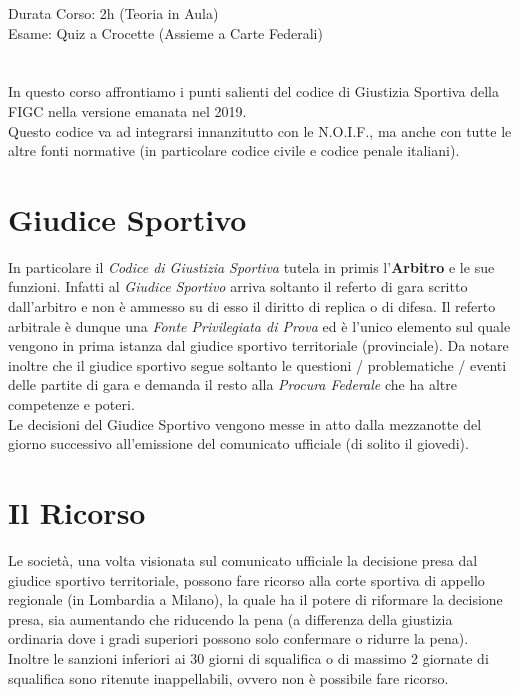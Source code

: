 \documentclass[../uefaC.tex]{subfiles}
\begin{document}

Durata Corso: 2h (Teoria in Aula) \hfill \\
Esame: Quiz a Crocette (Assieme a Carte Federali)
\hfill \\
\hfill \\
\hfill \\
In questo corso affrontiamo i punti salienti del codice di Giustizia Sportiva della FIGC nella versione emanata nel 2019. \hfill \\
Questo codice va ad integrarsi innanzitutto con le N.O.I.F., ma anche con tutte le altre fonti normative (in particolare codice civile e codice penale italiani).
\hfill \\

\section{Giudice Sportivo}
In particolare il \emph{Codice di Giustizia Sportiva} tutela in primis l'\textbf{Arbitro} e le sue funzioni. Infatti al \emph{Giudice Sportivo} arriva soltanto il referto di gara scritto dall'arbitro e non è ammesso su di esso il diritto di replica o di difesa. Il referto arbitrale è dunque una \emph{Fonte Privilegiata di Prova} ed è l'unico elemento sul quale vengono in prima istanza dal giudice sportivo territoriale (provinciale). Da notare inoltre che il giudice sportivo segue soltanto le questioni / problematiche / eventi delle partite di gara e demanda il resto alla \emph{Procura Federale} che ha altre competenze e poteri. \hfill \\
Le decisioni del Giudice Sportivo vengono messe in atto dalla mezzanotte del giorno successivo all'emissione del comunicato ufficiale (di solito il giovedi).

\section{Il Ricorso}
Le società, una volta visionata sul comunicato ufficiale la decisione presa dal giudice sportivo territoriale, possono fare ricorso alla corte sportiva di appello regionale (in Lombardia a Milano), la quale ha il potere di riformare la decisione presa, sia aumentando che riducendo la pena (a differenza della giustizia ordinaria dove i gradi superiori possono solo confermare o ridurre la pena). \hfill \\
Inoltre le sanzioni inferiori ai 30 giorni di squalifica o di massimo 2 giornate di squalifica sono ritenute inappellabili, ovvero non è possibile fare ricorso.
\end{document}
